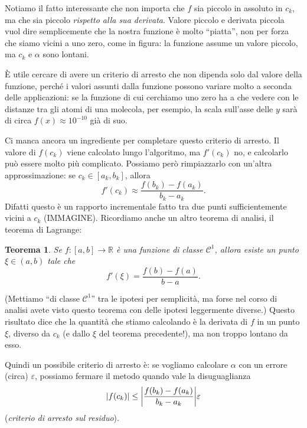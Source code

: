 \documentclass[a4paper]{report}
\DeclarePairedDelimiter{\abs}{\lvert}{\rvert}
\newtheorem{theorem}{Teorema}[chapter]
\theoremstyle{definiton}
\theoremstyle{remark}
\newcommand{\x}{\mathbf{x}}
\begin{document}
Notiamo il fatto interessante che non importa che $f$ sia piccolo in assoluto in $c_k$, ma che sia piccolo \emph{rispetto alla sua derivata}. Valore piccolo e derivata piccola vuol dire semplicemente che la nostra funzione è molto ``piatta'', non per forza che siamo vicini a uno zero, come in figura: la funzione assume un valore piccolo, ma $c_k$ e $\alpha$ sono lontani.
\begin{center}
\end{center}
È utile cercare di avere un criterio di arresto che non dipenda solo dal valore della funzione, perché i valori assunti dalla funzione possono variare molto a seconda delle applicazioni: se la funzione di cui cerchiamo uno zero ha a che vedere con le distanze tra gli atomi di una molecola, per esempio, la scala sull'asse delle $y$ sarà di circa $f(x) \approx 10^{-10}$ già di suo.

Ci manca ancora un ingrediente per completare questo criterio di arresto. Il valore di $f(c_k)$ viene calcolato lungo l'algoritmo, ma $f'(c_k)$ no, e calcolarlo può essere molto più complicato. Possiamo però rimpiazzarlo con un'altra approssimazione: se $c_k \in [a_k, b_k]$, allora
\[
f'(c_k) \approx \frac{f(b_k) - f(a_k)}{b_k - a_k}.
\]
Difatti questo è un rapporto incrementale fatto tra due punti sufficientemente vicini a $c_k$ (IMMAGINE). Ricordiamo anche un altro teorema di analisi, il teorema di Lagrange:
\begin{theorem}
    Se $f: [a,b] \to \mathbb{R}$ è una funzione di classe $\mathcal{C}^1$, allora esiste un punto $\xi \in (a,b)$ tale che
    \[
        f'(\xi) = \frac{f(b)-f(a)}{b-a}.
    \]
\end{theorem}
(Mettiamo ``di classe $\mathcal{C}^1$'' tra le ipotesi per semplicità, ma forse nel corso di analisi avete visto questo teorema con delle ipotesi leggermente diverse.) Questo risultato dice che la quantità che stiamo calcolando è la derivata di $f$ in un punto $\xi$, diverso da $c_k$ (e dallo $\xi$ del teorema precedente!), ma non troppo lontano da esso.

Quindi un possibile criterio di arresto è: se vogliamo calcolare $\alpha$ con un errore (circa) $\varepsilon$, possiamo fermare il metodo quando vale la disuguaglianza 
\[
\abs{f(c_k)} \leq \abs*{\frac{f(b_k) - f(a_k)}{b_k-a_k}} \varepsilon
\]
(\emph{criterio di arresto sul residuo}).
\end{document}
